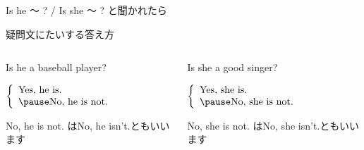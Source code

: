 \documentclass[aspectratio=169]{beamer}
\begin{document}
\begin{frame}[plain]{Is he  〜 ? / Is she 〜 ? と聞かれたら}
 \Large

疑問文にたいする答え方
\vspace{10pt}

\pause

\begin{columns}
\begin{column}{.475\textwidth}
Is he a baseball player?

\pause

\mbox{}\hspace{40pt}$\left\{\begin{array}{l}
         \text{Yes, he is.}\\\pause
         \text{No, he is not.}
        \end{array}\right.$

\pause

\mbox{}\hfill{}{\footnotesize No, he is not. はNo, he isn't.ともいいます}
\end{column}
\pause
\begin{column}{.475\textwidth}
Is she a good singer?

\pause

\mbox{}\hspace{40pt}$\left\{\begin{array}{l}
         \text{Yes, she is.}\\\pause
         \text{No, she is not.}
        \end{array}\right.$

\pause

\mbox{}\hfill{}{\footnotesize No, she is not. はNo, she isn't.ともいいます}


\end{column}
\end{columns}

\end{frame}
\end{document}

